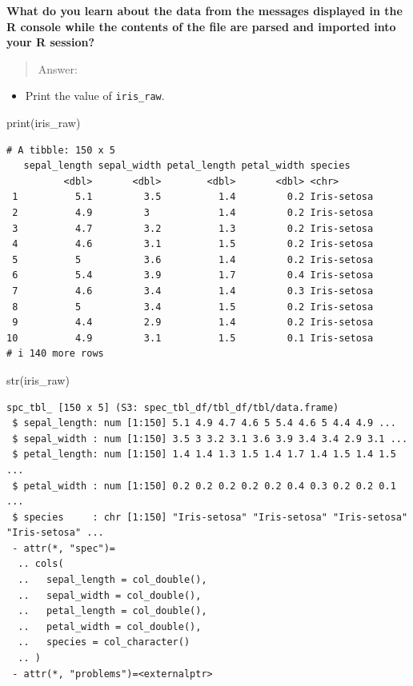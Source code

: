 \documentclass[
  letterpaper,
  DIV=11,
  numbers=noendperiod]{scrartcl}
\newenvironment{Shaded}{\begin{snugshade}}{\end{snugshade}}
\newcommand{\FunctionTok}[1]{\textcolor[rgb]{0.28,0.35,0.67}{#1}}
\newcommand{\NormalTok}[1]{\textcolor[rgb]{0.00,0.23,0.31}{#1}}
\providecommand{\tightlist}{%
  \setlength{\itemsep}{0pt}\setlength{\parskip}{0pt}}\usepackage{longtable,booktabs,array}
\begin{document}
\textbf{What do you learn about the data from the messages displayed in
the R console while the contents of the file are parsed and imported
into your R session?}

\begin{quote}
Answer:
\end{quote}

\begin{itemize}
\tightlist
\item
  Print the value of \texttt{iris\_raw}.
\end{itemize}

\begin{Shaded}
\begin{Highlighting}[]
\FunctionTok{print}\NormalTok{(iris\_raw)}
\end{Highlighting}
\end{Shaded}

\begin{verbatim}
# A tibble: 150 x 5
   sepal_length sepal_width petal_length petal_width species    
          <dbl>       <dbl>        <dbl>       <dbl> <chr>      
 1          5.1         3.5          1.4         0.2 Iris-setosa
 2          4.9         3            1.4         0.2 Iris-setosa
 3          4.7         3.2          1.3         0.2 Iris-setosa
 4          4.6         3.1          1.5         0.2 Iris-setosa
 5          5           3.6          1.4         0.2 Iris-setosa
 6          5.4         3.9          1.7         0.4 Iris-setosa
 7          4.6         3.4          1.4         0.3 Iris-setosa
 8          5           3.4          1.5         0.2 Iris-setosa
 9          4.4         2.9          1.4         0.2 Iris-setosa
10          4.9         3.1          1.5         0.1 Iris-setosa
# i 140 more rows
\end{verbatim}

\begin{Shaded}
\begin{Highlighting}[]
\FunctionTok{str}\NormalTok{(iris\_raw)}
\end{Highlighting}
\end{Shaded}

\begin{verbatim}
spc_tbl_ [150 x 5] (S3: spec_tbl_df/tbl_df/tbl/data.frame)
 $ sepal_length: num [1:150] 5.1 4.9 4.7 4.6 5 5.4 4.6 5 4.4 4.9 ...
 $ sepal_width : num [1:150] 3.5 3 3.2 3.1 3.6 3.9 3.4 3.4 2.9 3.1 ...
 $ petal_length: num [1:150] 1.4 1.4 1.3 1.5 1.4 1.7 1.4 1.5 1.4 1.5 ...
 $ petal_width : num [1:150] 0.2 0.2 0.2 0.2 0.2 0.4 0.3 0.2 0.2 0.1 ...
 $ species     : chr [1:150] "Iris-setosa" "Iris-setosa" "Iris-setosa" "Iris-setosa" ...
 - attr(*, "spec")=
  .. cols(
  ..   sepal_length = col_double(),
  ..   sepal_width = col_double(),
  ..   petal_length = col_double(),
  ..   petal_width = col_double(),
  ..   species = col_character()
  .. )
 - attr(*, "problems")=<externalptr> 
\end{verbatim}
\end{document}
